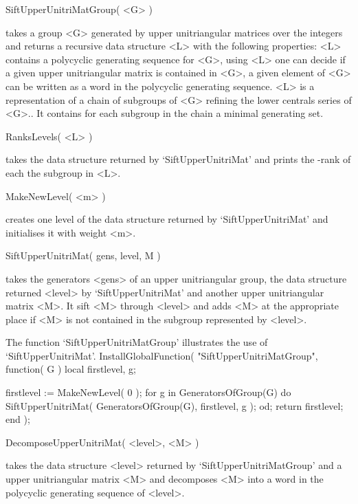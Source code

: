 \>SiftUpperUnitriMatGroup( <G> )
 
takes a group <G> generated by upper unitriangular matrices over the
integers and returns a recursive data structure <L> with the following
properties: <L> contains a polycyclic generating sequence for <G>,
using <L> one can decide if a given upper unitriangular matrix is
contained in <G>, a given element of <G> can be written as a word in
the polycyclic generating sequence.  <L> is a representation of a
chain of subgroups of <G> refining the lower centrals series of <G>..
It contains for each subgroup in the chain a minimal generating set.

\>RanksLevels( <L> )

takes the data structure returned by `SiftUpperUnitriMat' and prints
the \Z-rank of each the subgroup in <L>.

\>MakeNewLevel( <m> )

creates one level of the data structure returned by
`SiftUpperUnitriMat' and initialises it with weight <m>.

\>SiftUpperUnitriMat( gens, level, M )

takes the generators <gens> of an upper  unitriangular group, the data 
structure returned <level> by `SiftUpperUnitriMat' and another upper
unitriangular matrix <M>.  It sift <M> through <level> and adds <M> at
the appropriate place if <M> is not contained in the subgroup
represented by <level>. 

The function `SiftUpperUnitriMatGroup' illustrates the use of
`SiftUpperUnitriMat'.
\beginexample
InstallGlobalFunction( "SiftUpperUnitriMatGroup", function( G )
    local   firstlevel,  g;

    firstlevel := MakeNewLevel( 0 );
    for g in GeneratorsOfGroup(G) do
        SiftUpperUnitriMat( GeneratorsOfGroup(G), firstlevel, g );
    od;
    return firstlevel;
end );
\endexample

\>DecomposeUpperUnitriMat( <level>, <M> )

takes the data structure <level> returned by `SiftUpperUnitriMatGroup'
and a upper unitriangular matrix <M> and decomposes <M> into a word in
the polycyclic generating sequence of <level>.


